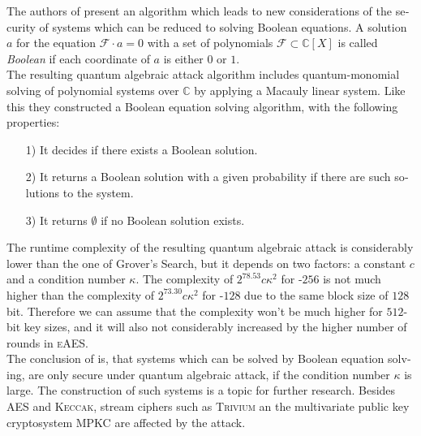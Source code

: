 \documentclass[a4paper,11pt]{article}
\begin{document}
\begin{otherlanguage}{english}
\begin{multicols}{2}
\noindent
The authors of \cite{QAA} present an algorithm which leads to new considerations of the security of systems which can be reduced to solving Boolean equations. A solution $a$ for the equation $\mathcal{F} \cdot a = 0$ with a set of polynomials $\mathcal{F} \subset \mathbb{C}[X]$ is called \textit{Boolean} if each coordinate of $a$ is either $0$ or $1$.\\

\noindent
The resulting quantum algebraic attack algorithm includes quantum-monomial solving of polynomial systems over $\mathbb{C}$ by applying a Macauly linear system. Like this they constructed a Boolean equation solving algorithm, with the following properties: \\

\begin{itemize} [noitemsep, nolistsep]
  \item[1)] It decides if there exists a Boolean solution.
  \vspace{0.1cm}
  \item[2)] It returns a Boolean solution with a given probability if there are such solutions to the system.
  \vspace{0.1cm}
  \item[3)] It returns $\emptyset$ if no Boolean solution exists.
\end{itemize}
\vspace{0.5cm}

\noindent
The runtime complexity of the resulting quantum algebraic attack is considerably lower than the one of Grover's Search, but it depends on two factors: a constant $c$ and a condition number $\kappa$. The complexity of $2^{78.53}c\kappa^2$ for -$256$ is not much higher than the complexity of $2^{73.30}c\kappa^2$ for -$128$ due to the same block size of $128$ bit. Therefore we can assume that the complexity won't be much higher for $512$-bit key sizes, and it will also not considerably increased by the higher number of rounds in \textsc{eAES}.\\


\noindent
The conclusion of \cite{QAA} is, that systems which can be solved by Boolean equation solving, are only secure under quantum algebraic attack, if the condition number $\kappa$ is large. The construction of such systems is a topic for further research. Besides \textsc{AES} and \textsc{Keccak}, stream ciphers such as \textsc{Trivium} an the multivariate public key cryptosystem \textsc{MPKC} are affected by the attack. \\


\end{multicols}
\end{otherlanguage}
\end{document}
